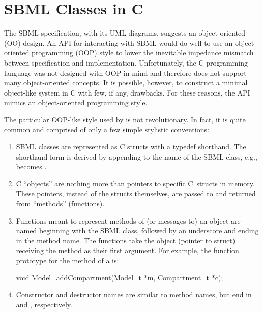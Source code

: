 \documentclass{sbmlmanual}
\begin{document}
\section{SBML Classes in C}
\label{sec:sbml-classes-in-c}

The SBML specification, with its UML diagrams, suggests an object-oriented
(OO) design.  An API for interacting with SBML would do well to use an
object-oriented programming (OOP) style to lower the inevitable impedance
mismatch between specification and implementation.  Unfortunately, the C
programming language was not designed with OOP in mind and therefore does
not support many object-oriented concepts.  It is possible, however, to
construct a minimal object-like system in C with few, if any, drawbacks.
For these reasons, the \libsbml{} API mimics an object-oriented programming
style.

The particular OOP-like style used by \libsbml{} is not
revolutionary.  In fact, it is quite common and comprised of only a
few simple stylistic conventions:

\begin{enumerate}

  \item SBML classes are represented as C structs with a typedef
  shorthand.  The shorthand form is derived by appending 
  to the name of the SBML class, e.g.,  becomes
  .

  \item C ``objects'' are nothing more than pointers to specific
  C~structs in memory.  These pointers, instead of the structs
  themselves, are passed to and returned from ``methods'' (functions).

  \item Functions meant to represent methods of (or messages to) an
  object are named beginning with the SBML class, followed by an
  underscore and ending in the method name.  The functions take the
  object (pointer to struct) receiving the method as their first
  argument.  For example, the function prototype for the
   method of a  is:

    \begin{example}[c]
    void Model_addCompartment(Model_t *m, Compartment_t *c);
    \end{example}

  \item Constructor and destructor names are similar to method names,
  but end in  and , respectively.

\end{enumerate}
\end{document}
